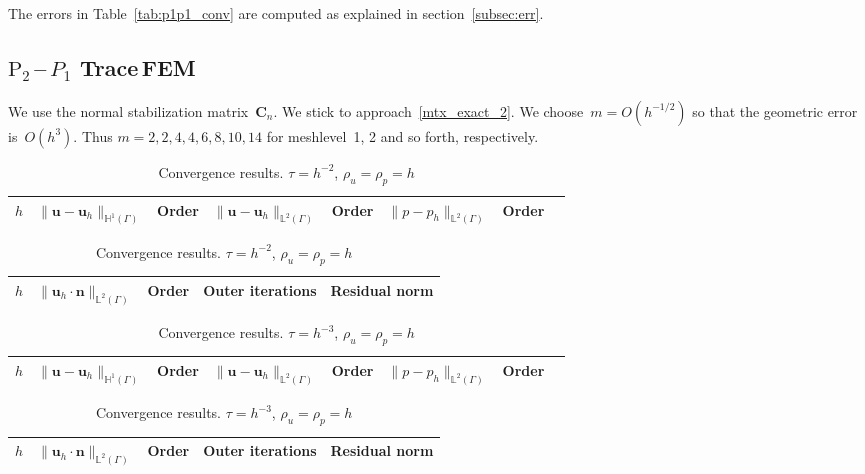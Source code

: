 \documentclass[12pt]{article}
\newcommand{\vect}[1]{\boldsymbol{\mathbf{#1}}}
\newcommand{\LTwoSpace}[1][\Gamma]{{\mathbb L^2\left({#1}\right)}}
\newcommand{\HOneSpace}[1][\Gamma]{{\mathbb H^1\left({#1}\right)}}
\begin{document}
The errors in Table~\ref{tab:p1p1_conv} are computed as explained in section~\ref{subsec:err}.

\clearpage

\subsection{$\text{P}_2$\,--\,$P_1$ Trace\,FEM}

We use the normal stabilization matrix~$\vect C_n$. We stick to approach~\eqref{mtx_exact_2}. We choose~$m = O(h^{-1/2})$ so that the geometric error is~$O(h^3)$. Thus $m = 2, 2, 4, 4, 6, 8, 10, 14$ for meshlevel~1, 2 and so forth, respectively.

\begin{table}[h!]
	\centering\small
	\caption{Convergence results. $\tau = h^{-2}$, $\rho_u = \rho_p = h$}
	\label{tab:p2p1_conv_old}
	\begin{subtable}{1.\linewidth}\centering
		\begin{tabular}[1.3]{|c||c|c||c|c||c||c|c|}
			\hline
			$h$ & $\|\vect u - \vect u_h\|_{\HOneSpace}$ & Order & $\|\vect u - \vect u_h\|_{\LTwoSpace}$ & Order & $\|p - p_h\|_{\LTwoSpace}$ & Order \\
			\hline
			
		\end{tabular}
	\end{subtable}
	\vskip 4mm	
	\begin{subtable}{1.\linewidth}\centering
		\begin{tabular}[1.3]{|c||c|c||c||c|}
			\hline
			$h$ & $\| \vect u_h\cdot\vect n \|_{\LTwoSpace}$ & Order & Outer iterations & Residual norm \\
			\hline
			
		\end{tabular}
	\end{subtable}
\end{table}

\begin{table}[h!]
	\centering\small
	\caption{Convergence results. $\tau = h^{-3}$, $\rho_u = \rho_p = h$}
	\label{tab:p2p1_conv}
	\begin{subtable}{1.\linewidth}\centering
		\begin{tabular}[1.3]{|c||c|c||c|c||c||c|c|}
			\hline
			$h$ & $\|\vect u - \vect u_h\|_{\HOneSpace}$ & Order & $\|\vect u - \vect u_h\|_{\LTwoSpace}$ & Order & $\|p - p_h\|_{\LTwoSpace}$ & Order \\
			\hline
			
		\end{tabular}
	\end{subtable}
	\vskip 4mm	
	\begin{subtable}{1.\linewidth}\centering
		\begin{tabular}[1.3]{|c||c|c||c||c|}
			\hline
			$h$ & $\| \vect u_h\cdot\vect n \|_{\LTwoSpace}$ & Order & Outer iterations & Residual norm \\
			\hline
			
		\end{tabular}
	\end{subtable}
\end{table}
\end{document}
